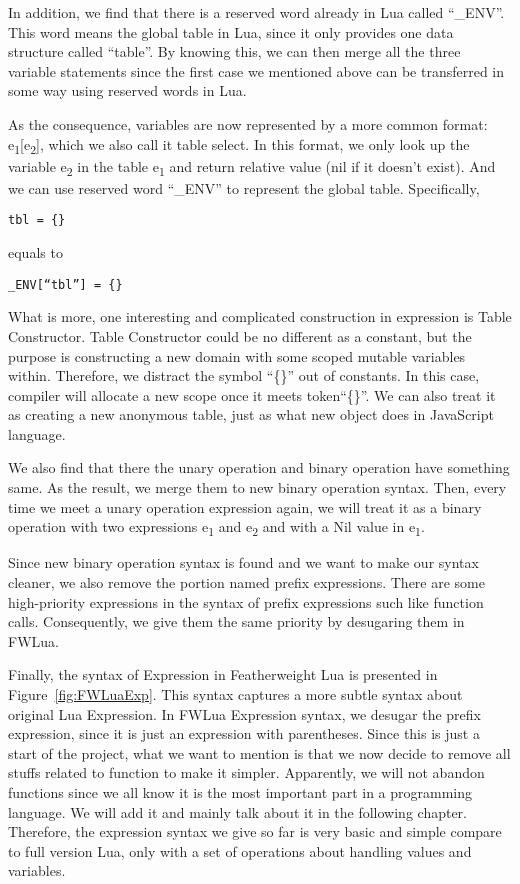 \documentclass{article}
\begin{document}
In addition, we find that there is a reserved word already in Lua called ``\_ENV''. This word means the global table in Lua, since it only provides one data structure called ``table''. By knowing this, we can then merge all the three variable statements since the first case we mentioned above can be transferred in some way using reserved words in Lua.

As the consequence, variables are now represented by a more common format: e\textsubscript{1}[e\textsubscript{2}], which we also call it table select. In this format, we only look up the variable e\textsubscript{2} in the table e\textsubscript{1} and return relative value (nil if it doesn't exist). And we can use reserved word ``\_ENV'' to represent the global table. Specifically,
\begin{flushleft}
\tt tbl = \{\}\\
\end{flushleft}
equals to
\begin{flushleft}
\tt \_ENV[``tbl''] = \{\}\\
\end{flushleft}

What is more, one interesting and complicated construction in expression is Table Constructor. Table Constructor could be no different as a constant, but the purpose is constructing a new domain with some scoped mutable variables within. Therefore, we distract the symbol ``\{\}'' out of constants. In this case, compiler will allocate a new scope once it meets token``\{\}''. We can also treat it as creating a new anonymous table, just as what new object does in JavaScript language.

We also find that there the unary operation and binary operation have something same. As the result, we merge them to new binary operation syntax. Then, every time we meet a unary operation expression again, we will treat it as a binary operation with two expressions e\textsubscript{1} and e\textsubscript{2} and with a Nil value in e\textsubscript{1}.

Since new binary operation syntax is found and we want to make our syntax cleaner, we also remove the portion named prefix expressions. There are some high-priority expressions in the syntax of prefix expressions such like function calls. Consequently, we give them the same priority by desugaring them in FWLua.

Finally, the syntax of Expression in Featherweight Lua is presented in Figure~\ref{fig:FWLuaExp}. This syntax captures a more subtle syntax about original Lua Expression. In FWLua Expression syntax, we desugar the prefix expression, since it is just an expression with parentheses. Since this is just a start of the project, what we want to mention is that we now decide to remove all stuffs related to function to make it simpler. Apparently, we will not abandon functions since we all know it is the most important part in a programming language. We will add it and mainly talk about it in the following chapter. Therefore, the expression syntax we give so far is very basic and simple compare to full version Lua, only with a set of operations about handling values and variables.
\end{document}
